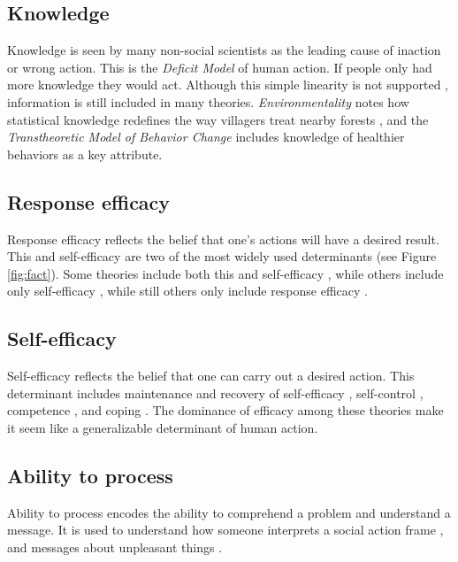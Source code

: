 \documentclass[12 pt]{article}
\begin{document}
		\subsection{Knowledge}
		Knowledge is seen by many non-social scientists as the leading cause of inaction or wrong action. This is the \textit{Deficit Model} of human action. If people only had more knowledge they would act. Although this simple linearity is not supported \parencite{Sturgis2004}, information is still included in many theories. \textit{Environmentality} notes how statistical knowledge redefines the way villagers treat nearby forests \parencite{Agrawal2005}, and the \textit{Transtheoretic Model of Behavior Change} includes knowledge of healthier behaviors as a key attribute. 
		\subsection{Response efficacy}
		Response efficacy reflects the belief that one's actions will have a desired result. This and self-efficacy are two of the most widely used determinants (see Figure \ref{fig:fact}). Some theories include both this and self-efficacy \parencite[e.g., \textit{EPPM} --][]{Maloney2011}, while others include only self-efficacy \parencite[e.g.,][]{Rimal2001}, while still others only include response efficacy \parencite[e.g.,][]{DeHoog2007}.    
		
		\subsection{Self-efficacy}
		Self-efficacy reflects the belief that one can carry out a desired action. This determinant includes maintenance and recovery of self-efficacy \parencite{Schwarzer2008}, self-control \parencite{Hagger2010}, competence \parencite{Ryan2000}, and coping \parencite{Carraro2013}. The dominance of efficacy among these theories make it seem like a generalizable determinant of human action. 
		
		\subsection{Ability to process}
		Ability to process encodes the ability to comprehend a problem and understand a message. It is used to understand how someone  interprets a social action frame \parencite{Benford2000}, and messages about unpleasant things \parencite{Vastfjall2016}. 
		
\end{document}
